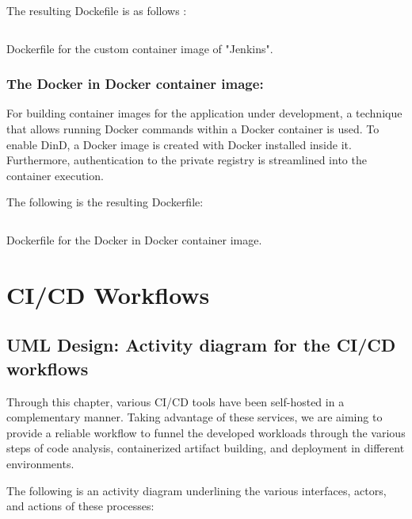 \newpage

\hspace{7mm}The resulting Dockefile is as follows : 

\begin{listing}[H]
    \inputminted{Dockerfile}{codeListing/jenkins_Dockerfile}
    \caption{Dockerfile for the custom container image of "Jenkins".}
    \label{lst:Jenkins Dockerfile}
\end{listing}

\subsubsection{The Docker in Docker container image: }

\hspace{7mm}For building container images for the application under development, a technique that allows running Docker commands within a Docker container is used. To enable DinD, a Docker image is created with Docker installed inside it. Furthermore, authentication to the private registry is streamlined into the container execution.

\hspace{7mm}The following is the resulting Dockerfile:

\begin{listing}[H]
    \inputminted{Dockerfile}{codeListing/dind-Dockerfile}
    \caption{Dockerfile for the Docker in Docker container image.}
    \label{lst:Dind Dockerfile}
\end{listing}

\newpage

\section{CI/CD Workflows}

\subsection{UML Design: Activity diagram for the CI/CD workflows } 

\hspace{7mm}Through this chapter, various CI/CD tools have been self-hosted in a complementary manner. Taking advantage of these services, we are aiming to provide a reliable workflow to funnel the developed workloads through the various steps of code analysis, containerized artifact building, and deployment in different environments.

\hspace{7mm}The following is an activity diagram underlining the various interfaces, actors, and actions of these processes: 

